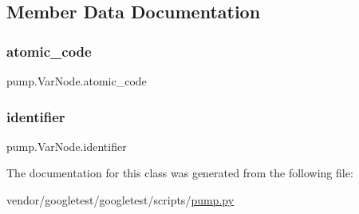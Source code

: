 \subsection{Member Data Documentation}
\mbox{\label{classpump_1_1_var_node_ad6bef6a8577b994fbe9ccddf3c82d2fc}} 
\subsubsection{\texorpdfstring{atomic\+\_\+code}{atomic\_code}}
{\footnotesize\ttfamily pump.\+Var\+Node.\+atomic\+\_\+code}

\mbox{\label{classpump_1_1_var_node_aa2b634e2443646c3754f2d193efa4dc7}} 
\subsubsection{\texorpdfstring{identifier}{identifier}}
{\footnotesize\ttfamily pump.\+Var\+Node.\+identifier}



The documentation for this class was generated from the following file\+:\begin{DoxyCompactItemize}
\item 
vendor/googletest/googletest/scripts/\hyperlink{pump_8py}{pump.\+py}\end{DoxyCompactItemize}
